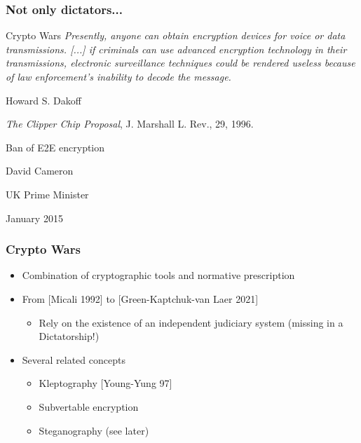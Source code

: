 \documentclass[]{beamer}
\begin{document}
\begin{frame}
\frametitle{Not only dictators...}
\begin{block}{Crypto Wars}
{\em\color{brown} Presently, anyone can obtain encryption devices for voice or data transmissions. [...]
if criminals can use advanced encryption technology in
their transmissions, electronic surveillance techniques could be rendered 
useless because of law enforcement’s inability to decode the message.}

\medskip

\hfill {\color{teal} Howard S. Dakoff}

\hfill {\color{teal} {\em The Clipper Chip Proposal},}
{\color{teal} J. Marshall L. Rev., 29, 1996.}
\end{block}

\begin{block}{Ban of E2E encryption}
\color{brown}{\em
In our country, do we want to allow a means of communication between people which even in extremis, with a signed warrant from the Home Secretary personally, that we cannot read?}

\color{teal}
\hfill David Cameron

\hfill UK Prime Minister

\hfill January 2015 
\end{block}
\end{frame}

\begin{frame}
\frametitle{Crypto Wars}

\begin{itemize}
\item Combination of cryptographic tools and normative prescription

\item From [Micali 1992] to [Green-Kaptchuk-van Laer 2021]

\begin{itemize}
\item Rely on the existence of an independent judiciary system (missing in a Dictatorship!)
\end{itemize}
\item Several related concepts
\begin{itemize}
\item Kleptography [Young-Yung 97]
\item Subvertable encryption
\item Steganography (see later)
\end{itemize}
\end{itemize}
\end{frame}
\end{document}

